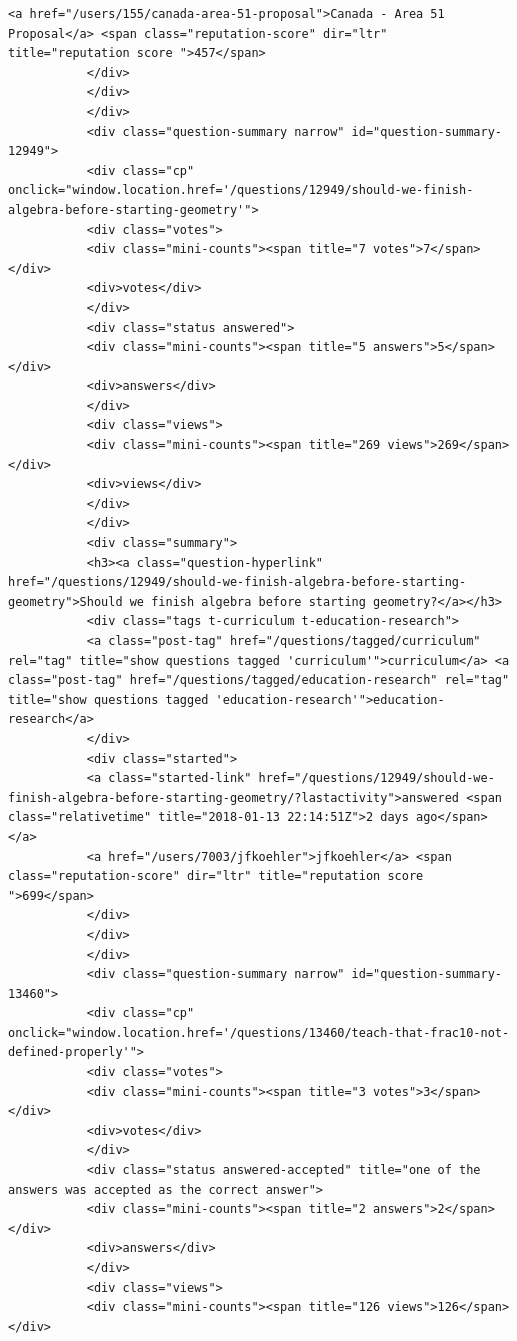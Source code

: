 \documentclass[11pt]{article}
\begin{document}
\begin{Verbatim}[commandchars=\\\{\}]
           <a href="/users/155/canada-area-51-proposal">Canada - Area 51 Proposal</a> <span class="reputation-score" dir="ltr" title="reputation score ">457</span>
           </div>
           </div>
           </div>
           <div class="question-summary narrow" id="question-summary-12949">
           <div class="cp" onclick="window.location.href='/questions/12949/should-we-finish-algebra-before-starting-geometry'">
           <div class="votes">
           <div class="mini-counts"><span title="7 votes">7</span></div>
           <div>votes</div>
           </div>
           <div class="status answered">
           <div class="mini-counts"><span title="5 answers">5</span></div>
           <div>answers</div>
           </div>
           <div class="views">
           <div class="mini-counts"><span title="269 views">269</span></div>
           <div>views</div>
           </div>
           </div>
           <div class="summary">
           <h3><a class="question-hyperlink" href="/questions/12949/should-we-finish-algebra-before-starting-geometry">Should we finish algebra before starting geometry?</a></h3>
           <div class="tags t-curriculum t-education-research">
           <a class="post-tag" href="/questions/tagged/curriculum" rel="tag" title="show questions tagged 'curriculum'">curriculum</a> <a class="post-tag" href="/questions/tagged/education-research" rel="tag" title="show questions tagged 'education-research'">education-research</a>
           </div>
           <div class="started">
           <a class="started-link" href="/questions/12949/should-we-finish-algebra-before-starting-geometry/?lastactivity">answered <span class="relativetime" title="2018-01-13 22:14:51Z">2 days ago</span></a>
           <a href="/users/7003/jfkoehler">jfkoehler</a> <span class="reputation-score" dir="ltr" title="reputation score ">699</span>
           </div>
           </div>
           </div>
           <div class="question-summary narrow" id="question-summary-13460">
           <div class="cp" onclick="window.location.href='/questions/13460/teach-that-frac10-not-defined-properly'">
           <div class="votes">
           <div class="mini-counts"><span title="3 votes">3</span></div>
           <div>votes</div>
           </div>
           <div class="status answered-accepted" title="one of the answers was accepted as the correct answer">
           <div class="mini-counts"><span title="2 answers">2</span></div>
           <div>answers</div>
           </div>
           <div class="views">
           <div class="mini-counts"><span title="126 views">126</span></div>

\end{Verbatim}
\end{document}
